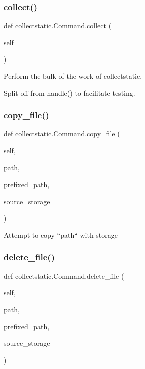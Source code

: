 \subsubsection{\texorpdfstring{collect()}{collect()}}
{\footnotesize\ttfamily def collectstatic.\+Command.\+collect (\begin{DoxyParamCaption}\item[{}]{self }\end{DoxyParamCaption})}

\begin{DoxyVerb}Perform the bulk of the work of collectstatic.

Split off from handle() to facilitate testing.
\end{DoxyVerb}
 \mbox{\label{classcollectstatic_1_1_command_abb286d406dd14579b3dd7cfca30ec3a7}} 
\subsubsection{\texorpdfstring{copy\+\_\+file()}{copy\_file()}}
{\footnotesize\ttfamily def collectstatic.\+Command.\+copy\+\_\+file (\begin{DoxyParamCaption}\item[{}]{self,  }\item[{}]{path,  }\item[{}]{prefixed\+\_\+path,  }\item[{}]{source\+\_\+storage }\end{DoxyParamCaption})}

\begin{DoxyVerb}Attempt to copy ``path`` with storage
\end{DoxyVerb}
 \mbox{\label{classcollectstatic_1_1_command_a354250ae3e24ff46188e4ff2a25de53e}} 
\subsubsection{\texorpdfstring{delete\+\_\+file()}{delete\_file()}}
{\footnotesize\ttfamily def collectstatic.\+Command.\+delete\+\_\+file (\begin{DoxyParamCaption}\item[{}]{self,  }\item[{}]{path,  }\item[{}]{prefixed\+\_\+path,  }\item[{}]{source\+\_\+storage }\end{DoxyParamCaption})}

